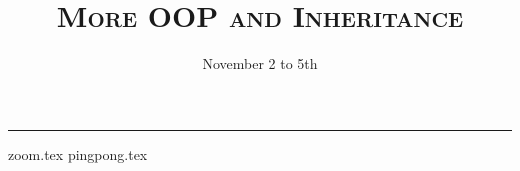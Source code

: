 \documentclass{exam}
\title{\textsc{More OOP and Inheritance}}
\date{November 2 to 5th}
\begin{document}
\maketitle
\rule{\textwidth}{0.15em}
\fontsize{12}{15}\selectfont


\begin{questions}
{zoom.tex}
\newpage
{pingpong.tex}
\newpage
\end{questions}
\end{document}
